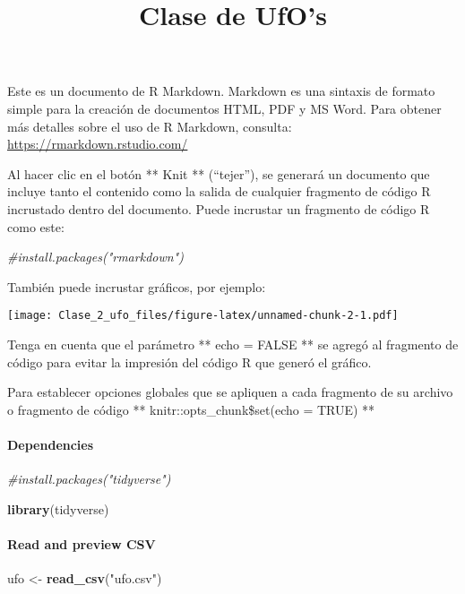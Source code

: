 \documentclass[]{article}
\title{Clase de UfO's}
\author{}
\date{\vspace{-2.5em}}
\newenvironment{Shaded}{\begin{snugshade}}{\end{snugshade}}
\newcommand{\KeywordTok}[1]{\textcolor[rgb]{0.13,0.29,0.53}{\textbf{#1}}}
\newcommand{\StringTok}[1]{\textcolor[rgb]{0.31,0.60,0.02}{#1}}
\newcommand{\CommentTok}[1]{\textcolor[rgb]{0.56,0.35,0.01}{\textit{#1}}}
\newcommand{\NormalTok}[1]{#1}
\let\oldparagraph\paragraph
\renewcommand{\paragraph}[1]{\oldparagraph{#1}\mbox{}}
\begin{document}
\maketitle

Este es un documento de R Markdown. Markdown es una sintaxis de formato
simple para la creación de documentos HTML, PDF y MS Word. Para obtener
más detalles sobre el uso de R Markdown, consulta:
\url{https://rmarkdown.rstudio.com/}

Al hacer clic en el botón ** Knit ** (``tejer''), se generará un
documento que incluye tanto el contenido como la salida de cualquier
fragmento de código R incrustado dentro del documento. Puede incrustar
un fragmento de código R como este:

\begin{Shaded}
\begin{Highlighting}[]
\CommentTok{#install.packages("rmarkdown")}
\end{Highlighting}
\end{Shaded}

También puede incrustar gráficos, por ejemplo:

\texttt{[image: Clase\_2\_ufo\_files/figure-latex/unnamed-chunk-2-1.pdf]}

Tenga en cuenta que el parámetro ** echo = FALSE ** se agregó al
fragmento de código para evitar la impresión del código R que generó el
gráfico.

Para establecer opciones globales que se apliquen a cada fragmento de su
archivo o fragmento de código ** knitr::opts\_chunk\$set(echo = TRUE) **

\paragraph{Dependencies}\label{dependencies}

\begin{Shaded}
\begin{Highlighting}[]
\CommentTok{#install.packages("tidyverse")}

\KeywordTok{library}\NormalTok{(tidyverse)}
\end{Highlighting}
\end{Shaded}

\paragraph{Read and preview CSV}\label{read-and-preview-csv}

\begin{Shaded}
\begin{Highlighting}[]
\NormalTok{ufo <-}\StringTok{ }\KeywordTok{read_csv}\NormalTok{(}\StringTok{"ufo.csv"}\NormalTok{)}
\end{Highlighting}
\end{Shaded}
\end{document}
